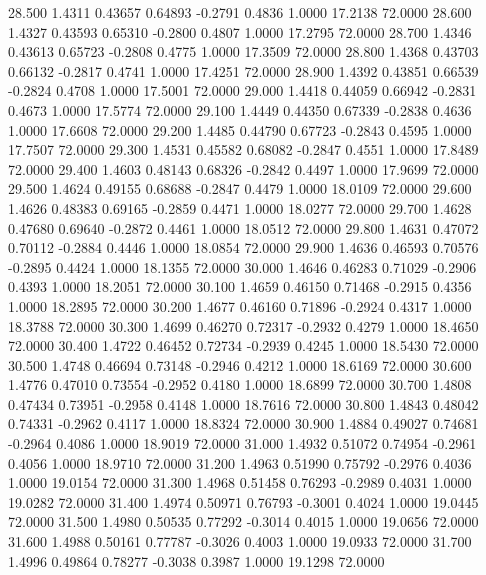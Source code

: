   28.500   1.4311   0.43657   0.64893  -0.2791   0.4836   1.0000  17.2138  72.0000
  28.600   1.4327   0.43593   0.65310  -0.2800   0.4807   1.0000  17.2795  72.0000
  28.700   1.4346   0.43613   0.65723  -0.2808   0.4775   1.0000  17.3509  72.0000
  28.800   1.4368   0.43703   0.66132  -0.2817   0.4741   1.0000  17.4251  72.0000
  28.900   1.4392   0.43851   0.66539  -0.2824   0.4708   1.0000  17.5001  72.0000
  29.000   1.4418   0.44059   0.66942  -0.2831   0.4673   1.0000  17.5774  72.0000
  29.100   1.4449   0.44350   0.67339  -0.2838   0.4636   1.0000  17.6608  72.0000
  29.200   1.4485   0.44790   0.67723  -0.2843   0.4595   1.0000  17.7507  72.0000
  29.300   1.4531   0.45582   0.68082  -0.2847   0.4551   1.0000  17.8489  72.0000
  29.400   1.4603   0.48143   0.68326  -0.2842   0.4497   1.0000  17.9699  72.0000
  29.500   1.4624   0.49155   0.68688  -0.2847   0.4479   1.0000  18.0109  72.0000
  29.600   1.4626   0.48383   0.69165  -0.2859   0.4471   1.0000  18.0277  72.0000
  29.700   1.4628   0.47680   0.69640  -0.2872   0.4461   1.0000  18.0512  72.0000
  29.800   1.4631   0.47072   0.70112  -0.2884   0.4446   1.0000  18.0854  72.0000
  29.900   1.4636   0.46593   0.70576  -0.2895   0.4424   1.0000  18.1355  72.0000
  30.000   1.4646   0.46283   0.71029  -0.2906   0.4393   1.0000  18.2051  72.0000
  30.100   1.4659   0.46150   0.71468  -0.2915   0.4356   1.0000  18.2895  72.0000
  30.200   1.4677   0.46160   0.71896  -0.2924   0.4317   1.0000  18.3788  72.0000
  30.300   1.4699   0.46270   0.72317  -0.2932   0.4279   1.0000  18.4650  72.0000
  30.400   1.4722   0.46452   0.72734  -0.2939   0.4245   1.0000  18.5430  72.0000
  30.500   1.4748   0.46694   0.73148  -0.2946   0.4212   1.0000  18.6169  72.0000
  30.600   1.4776   0.47010   0.73554  -0.2952   0.4180   1.0000  18.6899  72.0000
  30.700   1.4808   0.47434   0.73951  -0.2958   0.4148   1.0000  18.7616  72.0000
  30.800   1.4843   0.48042   0.74331  -0.2962   0.4117   1.0000  18.8324  72.0000
  30.900   1.4884   0.49027   0.74681  -0.2964   0.4086   1.0000  18.9019  72.0000
  31.000   1.4932   0.51072   0.74954  -0.2961   0.4056   1.0000  18.9710  72.0000
  31.200   1.4963   0.51990   0.75792  -0.2976   0.4036   1.0000  19.0154  72.0000
  31.300   1.4968   0.51458   0.76293  -0.2989   0.4031   1.0000  19.0282  72.0000
  31.400   1.4974   0.50971   0.76793  -0.3001   0.4024   1.0000  19.0445  72.0000
  31.500   1.4980   0.50535   0.77292  -0.3014   0.4015   1.0000  19.0656  72.0000
  31.600   1.4988   0.50161   0.77787  -0.3026   0.4003   1.0000  19.0933  72.0000
  31.700   1.4996   0.49864   0.78277  -0.3038   0.3987   1.0000  19.1298  72.0000

